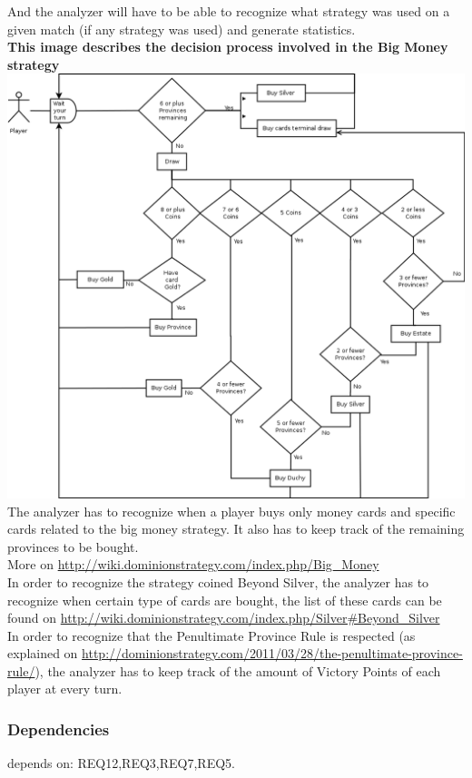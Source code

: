 \documentclass{scrreprt}
\begin{document}
And the analyzer will have to be able to recognize what strategy was used on a
given match (if any strategy was used) and generate statistics.\\
\newpage
\textbf{This image describes the decision process involved in the Big Money strategy}\\
\includegraphics[width=\textwidth,height=\textheight,keepaspectratio]{big-money}\\
The analyzer has to recognize when a player buys only money cards and specific cards related to the big money strategy. It also has to keep track of the remaining provinces to be bought.\\
More on \url{http://wiki.dominionstrategy.com/index.php/Big_Money}\\

In order to recognize the strategy coined Beyond Silver, the analyzer has to recognize when certain type of cards are bought, the list of these cards can be found on \url{http://wiki.dominionstrategy.com/index.php/Silver#Beyond_Silver}\\

In order to recognize that the Penultimate Province Rule is respected (as explained on \url{http://dominionstrategy.com/2011/03/28/the-penultimate-province-rule/}), the analyzer has to keep track of the amount of Victory Points of each player at every turn.

\subsubsection{Dependencies}
depends on: REQ12,REQ3,REQ7,REQ5.
\end{document}
